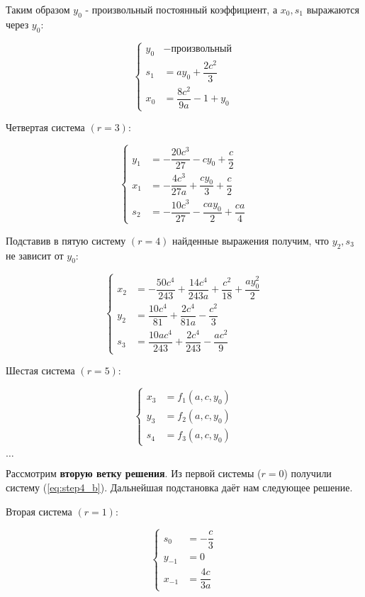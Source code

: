 Таким образом $ y_0 $ - произвольный постоянный коэффициент, а $ x_0, s_1 $ выражаются через $ y_0 $:

$$
\left\{
	\begin{aligned}
		y_{0} &- \text{произвольный} \\
		s_{1} &= ay_0 + \dfrac{2c^2}{3} \\
		x_{0} &= \dfrac{8c^2}{9a} - 1 + y_0
	\end{aligned}
\right.
$$

Четвертая система $ (r = 3) $:

$$
\left\{
	\begin{aligned}
		y_1 &= -\dfrac{20c^3}{27} - cy_0 + \dfrac{c}{2} \\
		x_1 &= -\dfrac{4c^3}{27a} + \dfrac{cy_0}{3} + \dfrac{c}{2} \\
		s_2 &= -\dfrac{10c^3}{27} - \dfrac{cay_0}{2} + \dfrac{ca}{4}
	\end{aligned}
\right.
$$

Подставив в пятую систему $ (r = 4) $ найденные выражения получим, что $ y_2,s_3 $ не зависит от $ y_0 $:

$$
\left\{
	\begin{aligned}
		x_2 &= -\dfrac{50c^4}{243} + \dfrac{14c^4}{243a} + \dfrac{c^2}{18} + \dfrac{ay^2_0}{2}\\
		y_2 &= \dfrac{10c^4}{81} + \dfrac{2c^4}{81a} - \dfrac{c^2}{3} \\
		s_3 &= \dfrac{10ac^4}{243} + \dfrac{2c^4}{243} - \dfrac{ac^2}{9}
	\end{aligned}
\right.
$$

Шестая система $ (r = 5) $:

$$
\left\{
	\begin{aligned}
		x_3 &= f_1(a,c,y_0) \\
		y_3 &= f_2(a,c,y_0) \\
		s_4 &= f_3(a,c,y_0)
	\end{aligned}
\right.
$$

\begin{center}
	$ \ldots $
\end{center}

\newpage

Рассмотрим \textbf{вторую ветку решения}. Из первой системы ($ r = 0 $) получили систему (\ref{eq:step4_b}). Дальнейшая подстановка даёт нам следующее решение.

Вторая система $ (r = 1) $:

$$
\left\{
	\begin{aligned}
		s_{0} &= -\dfrac{c}{3} \\
		y_{-1} &= 0 \\
		x_{-1} &= \dfrac{4c}{3a}
	\end{aligned}
\right.
$$

